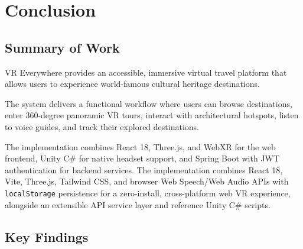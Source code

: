 \documentclass{tietreport}
\begin{document}
\chapter{Conclusion}

\section{Summary of Work}

VR Everywhere provides an accessible, immersive virtual travel platform that allows users to experience world-famous cultural heritage destinations.

The system delivers a functional workflow where users can browse destinations, enter 360-degree panoramic VR tours, interact with architectural hotspots, listen to voice guides, and track their explored destinations.

The implementation combines React 18, Three.js, and WebXR for the web frontend, Unity C\# for native headset support, and Spring Boot with JWT authentication for backend services.
The implementation combines React 18, Vite, Three.js, Tailwind CSS, and browser Web Speech/Web Audio APIs with \texttt{localStorage} persistence for a zero-install, cross-platform web VR experience, alongside an extensible API service layer and reference Unity C\# scripts.

\section{Key Findings}
\end{document}

